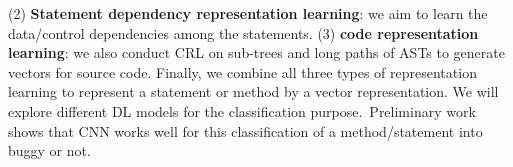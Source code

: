 %
(2) {\bf Statement dependency representation learning}: we aim to
learn the data/control dependencies among the statements. (3) {\bf
  code representation learning}: we also conduct CRL on sub-trees and
long paths of ASTs to generate vectors for source code. Finally, we
combine all three types of representation learning to represent a
statement or method by a vector representation. We will explore
different DL models for the classification purpose.~Preliminary
work shows that CNN works well for this classification of
a method/statement into buggy or not.



